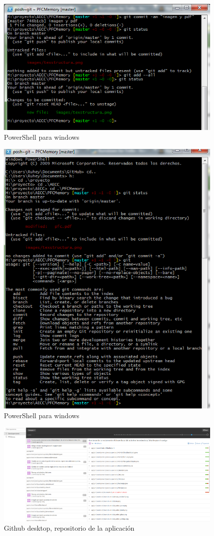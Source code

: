 \documentclass[../pfc.tex]{subfiles}
\begin{document}
	\begin{figure}[H]
		\centering
		\includegraphics[width=0.7\linewidth]{../images/powershellcommit}
		\caption{PowerShell para windows}
		\label{fig:powershellcommit}
	\end{figure}
	


	\begin{figure}[H]
		\centering
		\includegraphics[width=0.7\linewidth]{../images/powerShell}
		\caption{PowerShell para windows}
		\label{fig:powershell}
	\end{figure}

	
	\begin{figure}[H]
		\centering
		\includegraphics[width=1\linewidth]{../images/githubdesktopAplication}
		\caption{Github desktop, repositorio de la aplicación}
		\label{fig:ghdesktopA}
	\end{figure}
\end{document}
